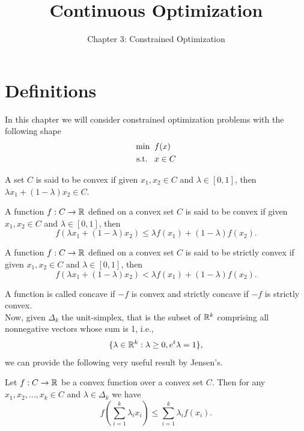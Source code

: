 \documentclass[10pt,a4paper]{article}
\title{Continuous Optimization}
\author{Chapter 3: Constrained Optimization}
\date{}
\begin{document}
	\maketitle
\section{Definitions}
	In this chapter we will consider constrained optimization problems with the following shape
	\begin{equation}\label{eq:problem}
		\begin{split}
			\min \;\; &f(x)\\
			\text{s.t.} \;\;\;& x \in C
		\end{split}
	\end{equation}
\begin{definition}
	A set $C$ is said to be convex if given $x_1,x_2\in C$ and $\lambda\in [0,1]$, then $\lambda x_1 +(1-\lambda) x_2 \in C.$
\end{definition}
\begin{definition}
A function $f:C\to \mathbb{R}$ defined on a convex set $C$ is said to be convex if given $x_1,x_2\in C$ and $\lambda\in [0,1]$, then 
\begin{equation*}
	f(\lambda x_1 +(1-\lambda) x_2) \leq \lambda f(x_1) +(1-\lambda) f(x_2).
\end{equation*}
\end{definition}
\begin{definition}
A function $f:C\to \mathbb{R}$ defined on a convex set $C$ is said to be strictly convex if given $x_1,x_2\in C$ and $\lambda\in [0,1]$, then 
\begin{equation*}
	f(\lambda x_1 +(1-\lambda) x_2) < \lambda f(x_1) +(1-\lambda) f(x_2).
\end{equation*}
\end{definition}
\noindent A function is called concave if $-f$ is convex and strictly concave if $-f$ is strictly convex.\\
Now, given $\Delta_k$ the unit-simplex, that is the
subset of $\mathbb{R}^k$ comprising all nonnegative vectors whose sum is 1, i.e., 
\begin{equation*}
	\{\lambda \in \mathbb{R}^k: \lambda\geq 0, e^t\lambda=1\},
\end{equation*}
we can provide the following very useful result by Jensen's.
\begin{theorem}
	Let $f:C\to \mathbb{R}$ be a convex function over a convex set $C$. Then for any $x_1, x_2, \dots, x_k \in C$ and $\lambda\in \Delta_k$ we have
	\begin{equation}\label{eq:jensen}
		f\left(\sum_{i=1}^{k}\lambda_ix_i\right) \leq \sum_{i=1}^{k} \lambda_if(x_i).
	\end{equation}
\end{theorem}
\end{document}
